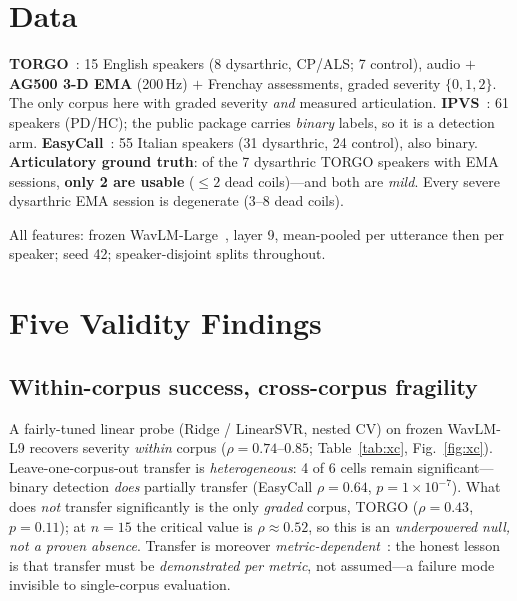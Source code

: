 \documentclass[conference]{IEEEtran}
\begin{document}
\section{Data}
\textbf{TORGO}~\cite{rudzicz2012torgo}: 15 English speakers (8 dysarthric,
CP/ALS; 7 control), audio $+$ \textbf{AG500 3-D EMA} (200\,Hz) $+$ Frenchay
assessments, graded severity $\{0,1,2\}$. The only corpus here with graded
severity \emph{and} measured articulation.
\textbf{IPVS}~\cite{dimauro2017ipvs}: 61 speakers (PD/HC); the public package
carries \emph{binary} labels, so it is a detection arm.
\textbf{EasyCall}~\cite{turrisi2021easycall}: 55 Italian speakers (31 dysarthric,
24 control), also binary.
\textbf{Articulatory ground truth}: of the 7 dysarthric TORGO speakers with EMA
sessions, \textbf{only 2 are usable} ($\le 2$ dead coils)---and both are
\emph{mild}. Every severe dysarthric EMA session is degenerate (3--8 dead coils).

All features: frozen WavLM-Large~\cite{chen2022wavlm}, layer 9, mean-pooled per
utterance then per speaker; seed 42; speaker-disjoint splits throughout.

\section{Five Validity Findings}

\subsection{Within-corpus success, cross-corpus fragility}
A fairly-tuned linear probe (Ridge / LinearSVR, nested CV) on frozen WavLM-L9
recovers severity \emph{within} corpus ($\rho{=}0.74$--$0.85$; Table~\ref{tab:xc},
Fig.~\ref{fig:xc}). Leave-one-corpus-out transfer is \emph{heterogeneous}: 4 of 6
cells remain significant---binary detection \emph{does} partially transfer
(EasyCall $\rho{=}0.64$, $p{=}1{\times}10^{-7}$). What does \emph{not} transfer
significantly is the only \emph{graded} corpus, TORGO ($\rho{=}0.43$, $p{=}0.11$);
at $n{=}15$ the critical value is $\rho{\approx}0.52$, so this is an
\emph{underpowered null, not a proven absence}. Transfer is moreover
\emph{metric-dependent}~\cite{frozenssl2026b}: the honest lesson is that transfer
must be \emph{demonstrated per metric}, not assumed---a failure mode invisible to
single-corpus evaluation.
\end{document}
